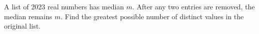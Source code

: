 A list of 2023 real numbers has median $m$. After any two entries are removed, the median remains $m$. Find the greatest possible number of distinct values in the original list.
